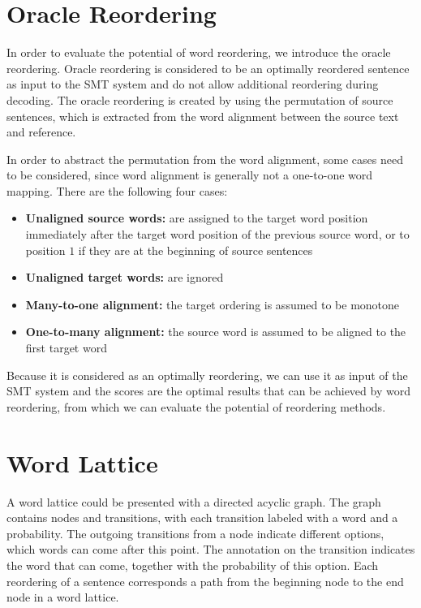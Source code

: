 \section{Oracle Reordering}
\label{ch:Foundations:sec:oracle}

In order to evaluate the potential of word reordering, we introduce the oracle reordering. Oracle reordering is considered to be an optimally reordered sentence as input to the \ac{SMT} system and do not allow additional reordering during decoding. \citep{combine} The oracle reordering is created by using the permutation of source sentences, which is extracted from the word alignment between the source text and reference.

In order to abstract the permutation from the word alignment, some cases need to be considered, since word alignment is generally not a one-to-one word mapping. There are the following four cases: \citep{birch2}

\begin{itemize}
\setlength{\itemsep}{0cm}%
\setlength{\parskip}{0cm}%
\item \textbf{Unaligned source words:} are assigned to the target word position immediately after the target word position of the previous source word, or to position $1$ if they are at the beginning of source sentences
\item \textbf{Unaligned target words:} are ignored
\item \textbf{Many-to-one alignment:} the target ordering is assumed to be monotone
\item \textbf{One-to-many alignment:} the source word is assumed to be aligned to the first target word
\end{itemize}

Because it is considered as an optimally reordering, we can use it as input of the \ac{SMT} system and the scores are the optimal results that can be achieved by word reordering, from which we can evaluate the potential of reordering methods.

\section{Word Lattice}
\label{ch:Foundations:sec:Lattices}
\label{latticecreation}
A word lattice could be presented with a directed acyclic graph. The graph contains nodes and transitions, with each transition labeled with a word and a probability. The outgoing transitions from a node indicate different options, which words can come after this point. The annotation on the transition indicates the word that can come, together with the probability of this option. Each reordering of a sentence corresponds a path from the beginning node to the end node in a word lattice. %

